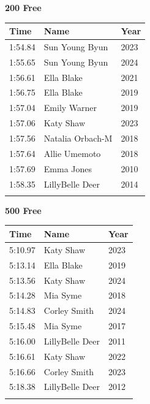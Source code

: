 \vspace{0.5em}
\noindent\begin{minipage}[t]{0.48\textwidth}
\centering
\textbf{\textcolor{teamprimary}{200 Free}}\par
\vspace{0.5em}
\centering
\small
\renewcommand{\arraystretch}{1.0}
\setlength{\tabcolsep}{4pt}
\begin{tabular}{@{}p{1.8cm}p{3.0cm}p{1.0cm}@{}}
\toprule
\textbf{Time} & \textbf{Name} & \textbf{Year} \\
\midrule
1:54.84 & Sun Young Byun & 2023 \\
1:55.65 & Sun Young Byun & 2024 \\
1:56.61 & Ella Blake & 2021 \\
1:56.75 & Ella Blake & 2019 \\
1:57.04 & Emily Warner & 2019 \\
1:57.06 & Katy Shaw & 2023 \\
1:57.56 & Natalia Orbach-M & 2018 \\
1:57.64 & Allie Umemoto & 2018 \\
1:57.69 & Emma Jones & 2010 \\
1:58.35 & LillyBelle Deer & 2014 \\
\bottomrule
\vspace{0.5em}
\end{tabular}
\end{minipage}
\hfill
\begin{minipage}[t]{0.48\textwidth}
\centering
\textbf{\textcolor{teamprimary}{500 Free}}\par
\vspace{0.5em}
\centering
\small
\renewcommand{\arraystretch}{1.0}
\setlength{\tabcolsep}{4pt}
\begin{tabular}{@{}p{1.8cm}p{3.0cm}p{1.0cm}@{}}
\toprule
\textbf{Time} & \textbf{Name} & \textbf{Year} \\
\midrule
5:10.97 & Katy Shaw & 2023 \\
5:13.14 & Ella Blake & 2019 \\
5:13.56 & Katy Shaw & 2024 \\
5:14.28 & Mia Syme & 2018 \\
5:14.83 & Corley Smith & 2024 \\
5:15.48 & Mia Syme & 2017 \\
5:16.00 & LillyBelle Deer & 2011 \\
5:16.61 & Katy Shaw & 2022 \\
5:16.66 & Corley Smith & 2023 \\
5:18.38 & LillyBelle Deer & 2012 \\
\bottomrule
\vspace{0.5em}
\end{tabular}
\end{minipage}

